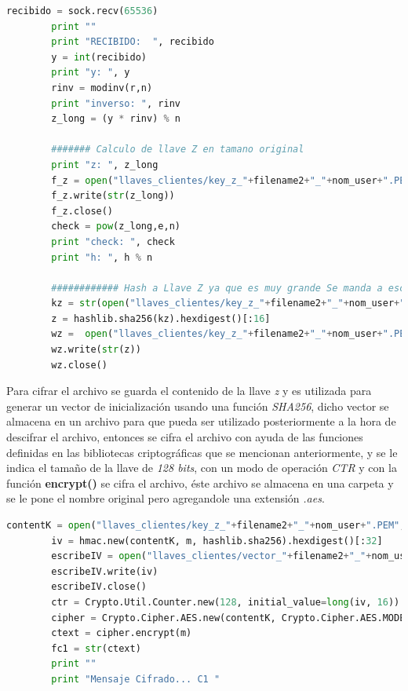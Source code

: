 \begin{lstlisting}[language=Python,frame=single, keywordstyle=\color{blue},breaklines=true, showstringspaces=false]
        recibido = sock.recv(65536)
        print ""
        print "RECIBIDO:  ", recibido
        y = int(recibido)
        print "y: ", y
        rinv = modinv(r,n)
        print "inverso: ", rinv
        z_long = (y * rinv) % n  

        ####### Calculo de llave Z en tamano original
        print "z: ", z_long
        f_z = open("llaves_clientes/key_z_"+filename2+"_"+nom_user+".PEM", "w")
        f_z.write(str(z_long))
        f_z.close()
        check = pow(z_long,e,n)
        print "check: ", check
        print "h: ", h % n

        ############ Hash a Llave Z ya que es muy grande Se manda a escribir de nuevo al archivo
        kz = str(open("llaves_clientes/key_z_"+filename2+"_"+nom_user+".PEM", "rb").read())
        z = hashlib.sha256(kz).hexdigest()[:16]
        wz =  open("llaves_clientes/key_z_"+filename2+"_"+nom_user+".PEM", "w")
        wz.write(str(z))
        wz.close()
\end{lstlisting}

Para cifrar el archivo se guarda el contenido de la llave \textit{z} y es utilizada para generar un vector de inicialización usando una función \textit{SHA256}, dicho vector se almacena en un archivo para que pueda ser utilizado posteriormente a la hora de descifrar el archivo, entonces se cifra el archivo con ayuda de las funciones definidas en las bibliotecas criptográficas que se mencionan anteriormente, y se le indica el tamaño de la llave de \textit{128 bits}, con un modo de operación \textit{CTR} y con la función \textbf{encrypt()} se cifra el archivo, éste archivo se almacena en una carpeta y se le pone el nombre original pero agregandole una  extensión \textit{.aes}.

\begin{lstlisting}[language=Python,frame=single, keywordstyle=\color{blue},breaklines=true, showstringspaces=false]
        contentK = open("llaves_clientes/key_z_"+filename2+"_"+nom_user+".PEM", "rb").read()
        iv = hmac.new(contentK, m, hashlib.sha256).hexdigest()[:32]  
        escribeIV = open("llaves_clientes/vector_"+filename2+"_"+nom_user+".txt","wb")
        escribeIV.write(iv)
        escribeIV.close()
        ctr = Crypto.Util.Counter.new(128, initial_value=long(iv, 16))
        cipher = Crypto.Cipher.AES.new(contentK, Crypto.Cipher.AES.MODE_CTR, counter=ctr)
        ctext = cipher.encrypt(m)
        fc1 = str(ctext)
        print ""
        print "Mensaje Cifrado... C1 "
\end{lstlisting}

